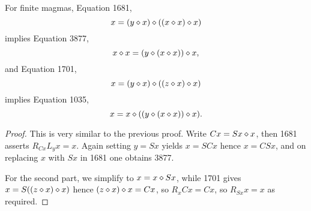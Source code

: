 \begin{proposition}\label{1681-3877-1701-1035}
  For finite magmas, Equation 1681,
$$ x = (y \diamond x) \diamond ((x \diamond x) \diamond x)$$
implies Equation 3877,
$$ x \diamond x = (y \diamond (x \diamond x)) \diamond x,$$
and Equation 1701,
$$ x = (y \diamond x) \diamond ((z \diamond x) \diamond x)$$
implies Equation 1035,
$$ x = x \diamond ((y \diamond (x \diamond x)) \diamond x).$$
\end{proposition}

\begin{proof} This is very similar to the previous proof.
  Write $Cx = Sx \diamond x$, then 1681 asserts $R_{Cx} L_y x = x$.  Again setting $y=Sx$ yields $x=SCx$ hence $x = CSx$, and on replacing $x$ with $Sx$ in 1681 one obtains 3877.

For the second part, we simplify to $x = x \diamond Sx$, while 1701 gives $x = S((z \diamond x) \diamond x)$ hence $(z \diamond x) \diamond x = Cx$, so $R_x Cx = Cx$, so $R_{Sx} x = x$ as required.
\end{proof}
